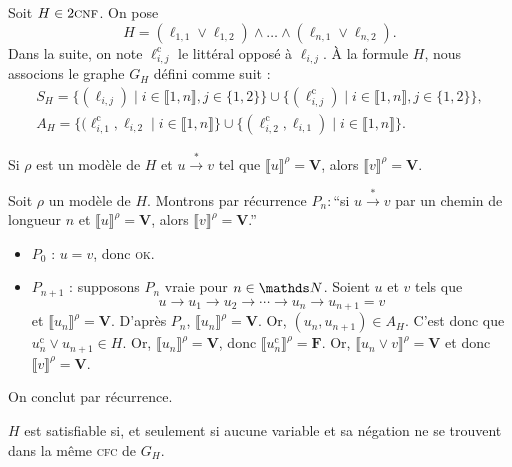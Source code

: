 \begin{prvk}
	Soit $H \in 2\textsc{cnf}$. On pose \[
		H = (\ell_{1,1} \lor \ell_{1,2}) \land \ldots \land (\ell_{n,1} \lor \ell_{n,2})
	.\]
	Dans la suite, on note $\ell_{i,j}^\mathrm{c}$\/ le littéral opposé à $\ell_{i,j}$.
	À la formule $H$, nous associons le graphe $G_H$\/ défini comme suit :
	\begin{gather*}
		S_H = \big\{(\ell_{i,j})  \mid i \in \llbracket 1,n \rrbracket, j \in \{1,2\} \big\}  \cup \big\{(\ell_{i,j}^\mathrm{c})  \mid i \in \llbracket 1,n \rrbracket, j \in \{1,2\}\big\}, \\
		A_H = \big\{ (\ell_{i,1}^\mathrm{c}, \ell_{i,2}  \mid i \in \llbracket 1,n \rrbracket \big\} \cup \big\{ (\ell_{i,2}^\mathrm{c}, \ell_{i,1})  \mid i \in \llbracket 1,n \rrbracket \big\}.
	\end{gather*}

	\begin{lem}
		Si $\rho$\/ est un modèle de $H$\/ et $u \xrightarrow* v$\/ tel que $\llbracket u \rrbracket^\rho = \mathbf{V}$, alors $\llbracket v \rrbracket^\rho = \mathbf{V}$.
	\end{lem}
	\begin{prv}
		 Soit $\rho$\/ un modèle de $H$.
		 Montrons par récurrence $P_n :{}$``si $u\xrightarrow* v$ par un chemin de longueur $n$ et $\llbracket u \rrbracket^\rho = \mathbf{V}$, alors $\llbracket v \rrbracket^\rho = \mathbf{V}$.''
		\begin{itemize}
			\item $P_0$\/ : $u = v$, donc \textsc{ok}.
			\item $P_{n+1}$\/ : supposons $P_n$\/ vraie pour $n \in \N$. Soient $u$\/ et $v$\/ tels que  \[
					u \to u_1 \to u_2 \to \cdots \to u_n \to u_{n+1} = v
				\] et $\llbracket u_n \rrbracket^\rho = \mathbf{V}$.
				D'après $P_n$, $\llbracket u_n \rrbracket^\rho = \mathbf{V}$. Or, $(u_n, u_{n+1}) \in A_H$. C'est donc que $u_n^\mathrm{c} \lor u_{n+1} \in H$.
				Or, $\llbracket u_n \rrbracket^\rho = \mathbf{V}$, donc $\llbracket u_n^\mathrm{c} \rrbracket^\rho = \mathbf{F}$. Or, $\llbracket u_n \lor v \rrbracket^\rho = \mathbf{V}$\/ et donc $\llbracket v \rrbracket^\rho = \mathbf{V}$.
		\end{itemize}
		On conclut par récurrence.
	\end{prv}

	\begin{prop}
		$H$\/ est satisfiable si, et seulement si aucune variable et sa négation ne se trouvent dans la même \textsc{cfc} de $G_H$.
	\end{prop}


\end{prvk}
